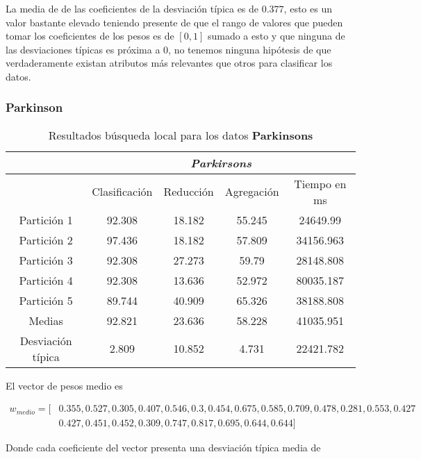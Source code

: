   La media de de las coeficientes de la desviación típica es de $0.377$, esto es un valor bastante elevado teniendo presente de que el rango de valores 
  que pueden tomar los coeficientes de los pesos es de $[0,1]$ 
  sumado a esto y que ninguna de las desviaciones típicas es
  próxima a $0$, no tenemos ninguna hipótesis de que verdaderamente 
  existan atributos más relevantes que otros para clasificar los datos.


\subsubsection*{Parkinson} 

\begin{table}[H]
  \centering
  \begin{tabular}{|c|c|c|c|c|}
    \hline
    & \multicolumn{4}{|c|}{\textit{Parkirsons}}  \\
    \hline
    &	Clasificación &		Reducción	
    &	Agregación	&	Tiempo en ms \\
    \hline
    Partición 1 & 92.308 &  18.182 &  55.245 &  24649.99  \\
    Partición 2 &	  97.436 &  18.182 &  57.809 &  34156.963  \\
    Partición 3 &	  92.308 &  27.273 &  59.79 &  28148.808   \\
    Partición 4	&   92.308 &  13.636 &  52.972 &  80035.187   \\
    Partición 5	 &   89.744 &  40.909 &  65.326 &  38188.808   \\
    \hline
    Medias 	 &   92.821 &  23.636 &  58.228 &  41035.951   \\
    \hline
    Desviación típica &	  2.809 &  10.852 &  4.731 &  22421.782   \\ 
    \hline  
  \end{tabular}
  \caption{Resultados búsqueda local para los datos \textbf{Parkinsons}}
  \label{table:BL_Parkinson}
\end{table}


El vector de pesos medio es 

\begin{align*}
  w_{medio} = [ 
    & 0.355, 0.527, 0.305, 0.407, 0.546, 0.3, 0.454, 0.675, 0.585, 0.709, 0.478, 0.281, 0.553, 0.427 \\
    & 0.427, 0.451, 0.452, 0.309, 0.747, 0.817, 0.695, 0.644, 0.644]
  \end{align*}
  
  Donde cada coeficiente del vector presenta una desviación típica media de 
  
